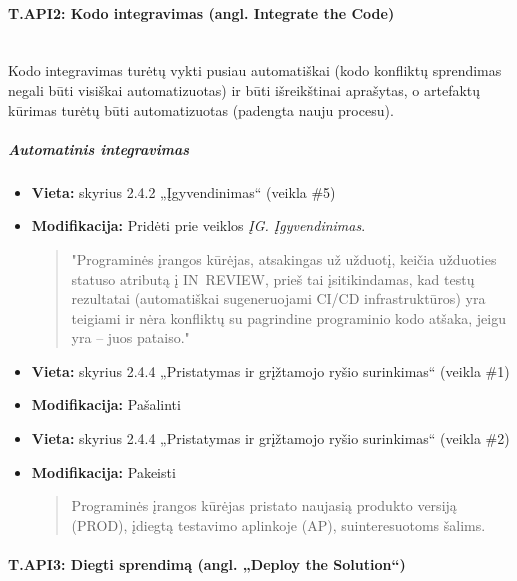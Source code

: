 \documentclass{article}
\newcommand{\subsubsubsection}[1]{\paragraph{#1}\mbox{}\\}
\begin{document}
\subsubsubsection{T.API2: Kodo integravimas (angl. Integrate the Code)}

Kodo integravimas turėtų vykti pusiau automatiškai (kodo konfliktų sprendimas negali būti visiškai automatizuotas) ir būti išreikštinai aprašytas, o artefaktų kūrimas turėtų būti automatizuotas (padengta nauju procesu).

\subparagraph{Automatinis integravimas}
\begin{itemize}
    \item \textbf{Vieta:} skyrius 2.4.2 „Įgyvendinimas“ (veikla \#5)
    \item \textbf{Modifikacija:} Pridėti prie veiklos \textit{ĮG. Įgyvendinimas}.
    \begin{quote}
        "Programinės įrangos kūrėjas, atsakingas už užduotį, keičia užduoties statuso atributą į \mbox{IN~REVIEW}, prieš tai įsitikindamas, kad testų rezultatai (automatiškai sugeneruojami CI/CD infrastruktūros) yra teigiami ir nėra konfliktų su pagrindine programinio kodo atšaka, jeigu yra -- juos pataiso."
    \end{quote}
\end{itemize}
\begin{itemize}
    \item \textbf{Vieta:} skyrius 2.4.4 „Pristatymas ir grįžtamojo ryšio surinkimas“ (veikla \#1)
    \item \textbf{Modifikacija:} Pašalinti
\end{itemize}
\begin{itemize}
    \item \textbf{Vieta:} skyrius 2.4.4 „Pristatymas ir grįžtamojo ryšio surinkimas“ (veikla \#2)
    \item \textbf{Modifikacija:} Pakeisti
    \begin{quote}
        Programinės įrangos kūrėjas pristato naujasią produkto versiją (PROD), įdiegtą testavimo aplinkoje (AP), suinteresuotoms šalims.
    \end{quote}
\end{itemize}

\subsubsubsection{T.API3: Diegti sprendimą (angl. „Deploy the Solution“) }
\end{document}
